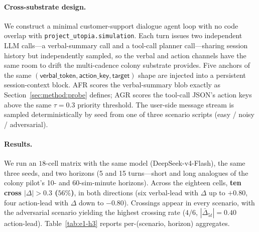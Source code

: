 \paragraph{Cross-substrate design.}
We construct a minimal customer-support dialogue agent loop with
no code overlap with \texttt{project\_utopia.simulation}. Each
turn issues two independent LLM calls---a verbal-summary call
and a tool-call planner call---sharing session history but
independently sampled, so the verbal and action channels have the
same room to drift the multi-cadence colony substrate provides.
Five anchors of the same $(\textsf{verbal\_token},
\textsf{action\_key}, \textsf{target})$ shape are injected into a
persistent session-context block. AFR scores the verbal-summary
blob exactly as Section~\ref{sec:method:probe} defines; AGR
scores the tool-call JSON's \textsf{action} keys above the same
$\tau = 0.3$ priority threshold. The user-side message stream is
sampled deterministically by seed from one of three scenario
scripts (\textsf{easy} / \textsf{noisy} / \textsf{adversarial}).

\paragraph{Results.}
We run an $18$-cell matrix with the same model (DeepSeek-v4-Flash),
the same three seeds, and two horizons (5 and 15 turns---short
and long analogues of the colony pilot's 10- and 60-sim-minute
horizons). Across the eighteen cells, \textbf{ten cross
$|\Delta| > 0.3$ ($56\%$)}, in both directions (six verbal-lead
with $\Delta$ up to $+0.80$, four action-lead with $\Delta$ down
to $-0.80$). Crossings appear in every scenario, with the
\textsf{adversarial} scenario yielding the highest crossing
rate ($4/6$, $|\bar\Delta_{5t}| = 0.40$ action-lead).
Table~\ref{tab:e1-h3} reports per-(scenario, horizon)
aggregates.


